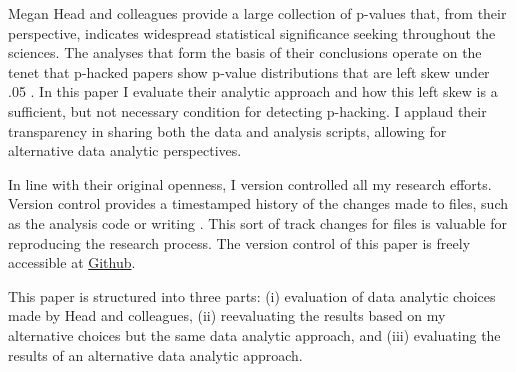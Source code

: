 Megan Head and colleagues provide a large collection of p-values that, from their perspective, indicates widespread statistical significance seeking throughout the sciences. The analyses that form the basis of their conclusions operate on the tenet that p-hacked papers show p-value distributions that are left skew under .05 \cite{Simonsohn2014}. In this paper I evaluate their analytic approach and how this left skew is a sufficient, but not necessary condition for detecting p-hacking. I applaud their transparency in sharing both the data and analysis scripts, allowing for alternative data analytic perspectives.

In line with their original openness, I version controlled all my research efforts. Version control provides a timestamped history of the changes made to files, such as the analysis code or writing \cite{Ram2013}. This sort of track changes for files is valuable for reproducing the research process. The version control of this paper is freely accessible at \href{https://github.com/chartgerink/2015head}{Github}.

This paper is structured into three parts: (i) evaluation of data analytic choices made by Head and colleagues, (ii) reevaluating the results based on my alternative choices but the same data analytic approach, and (iii) evaluating the results of an alternative data analytic approach.
